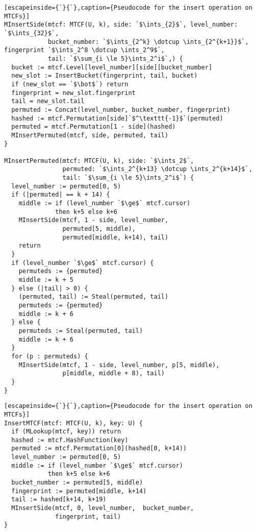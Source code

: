 \documentclass[sigconf, nonacm]{acmart}
\newcommand{\ints}{\mathbb{Z}}
\newcommand{\dotcup}{\ensuremath{\mathaccent\cdot\cup}}
\begin{document}
\begin{lstlisting}[escapeinside={`}{`},caption={Pseudocode for the insert operation on MTCFs}]
MInsertSide(mtcf: MTCF(U, k), side: `$\ints_{2}$`, level_number: `$\ints_{32}$`,
            bucket_number: `$\ints_{2^k} \dotcup \ints_{2^{k+1}}$`, fingerprint `$\ints_2^8 \dotcup \ints_2^9$`,
            tail: `$\sum_{i \le 5}\ints_2^i$`,) {
  bucket := mtcf.Level[level_number][side][bucket_number]
  new_slot := InsertBucket(fingerprint, tail, bucket)
  if (new_slot == `$\bot$`) return
  fingerprint = new_slot.fingerprint
  tail = new_slot.tail
  permuted := Concat(level_number, bucket_number, fingerprint)
  hashed := mtcf.Permutation[side]`$^\texttt{-1}$`(permuted)
  permuted = mtcf.Permutation[1 - side](hashed)
  MInsertPermuted(mtcf, side, permuted, tail)
}

MInsertPermuted(mtcf: MTCF(U, k), side: `$\ints_2$`,
                permuted: `$\ints_2^{k+13} \dotcup \ints_2^{k+14}$`,
                tail: `$\sum_{i \le 5}\ints_2^i$`) {
  level_number := permuted[0, 5)
  if (|permuted| == k + 14) {
    middle := if (level_number `$\ge$` mtcf.cursor)
              then k+5 else k+6
    MInsertSide(mtcf, 1 - side, level_number,
                permuted[5, middle),
                permuted[middle, k+14), tail)
    return
  }
  if (level_number `$\ge$` mtcf.cursor) {
    permuteds := {permuted}
    middle := k + 5
  } else (|tail| > 0) {
    (permuted, tail) := Steal(permuted, tail)
    permuteds := {permuted}
    middle := k + 6
  } else {
    permuteds := Steal(permuted, tail)
    middle := k + 6
  }
  for (p : permuteds) {
    MInsertSide(mtcf, 1 - side, level_number, p[5, middle),
                p[middle, middle + 8), tail)
  }
}
\end{lstlisting}

\begin{lstlisting}[escapeinside={`}{`},caption={Pseudocode for the insert operation on MTCFs}]
InsertMTCF(mtcf: MTCF(U, k), key: U) {
  if (MLookup(mtcf, key)) return
  hashed := mtcf.HashFunction(key)
  permuted := mtcf.Permutation[0](hashed[0, k+14))
  level_number := permuted[0, 5)
  middle := if (level_number `$\ge$` mtcf.cursor)
            then k+5 else k+6
  bucket_number := permuted[5, middle)
  fingerprint := permuted[middle, k+14)
  tail := hashed[k+14, k+19)
  MInsertSide(mtcf, 0, level_number,  bucket_number,
              fingerprint, tail)
}
\end{lstlisting}
\end{document}
